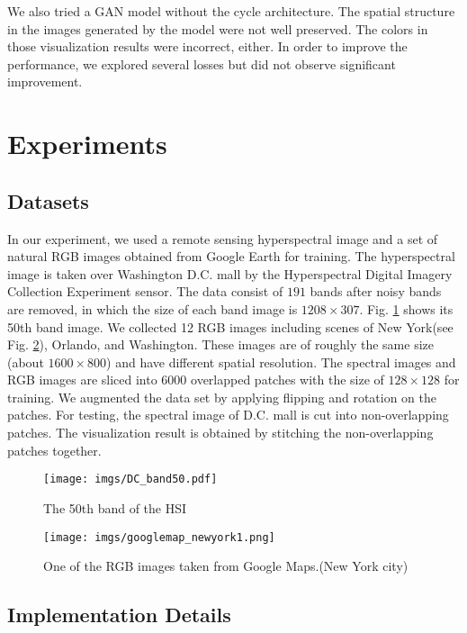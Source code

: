 \documentclass[10pt,conference,a4paper]{IEEEtran}
\begin{document}
We also tried a GAN model without the cycle architecture. The spatial structure in the images generated by the model were not well preserved. The colors in those visualization results were incorrect, either. In order to improve the performance, we explored several losses but did not observe significant improvement.

\section{Experiments}
\label{sec:experiments}

\subsection{Datasets}
In our experiment, we used a remote sensing hyperspectral image and a set of natural RGB images obtained  from Google Earth for training.
The hyperspectral image is taken over Washington D.C. mall by the Hyperspectral
Digital Imagery Collection Experiment sensor. The
data consist of $191$ bands after noisy bands are removed, in
which the size of each band image is $1208 \times 307$. Fig. \ref{fig:band50}  shows its 50th band image.
We collected 12 RGB images including scenes of New York(see Fig. \ref{fig:googlemap_newyork}), Orlando, and Washington. These images are of roughly the same size (about $1600 \times 800$) and have different spatial resolution.
The spectral images and RGB images are sliced into 6000 overlapped patches with the size of $128\times 128$ for training.
We augmented the data set by applying flipping and rotation on the patches.
For testing, the spectral image of D.C. mall is cut into non-overlapping patches.
The visualization result is obtained by stitching the non-overlapping patches together.

\begin{figure}[t]
\centering
\texttt{[image: imgs/DC\_band50.pdf]}
\caption{The 50th band of the HSI}\label{fig:band50}
\end{figure}

\begin{figure}[t]
\centering
\texttt{[image: imgs/googlemap\_newyork1.png]}
\caption{One of the RGB images taken from Google Maps.(New York city)}
\label{fig:googlemap_newyork}
\end{figure}

\subsection{Implementation Details}
\end{document}
